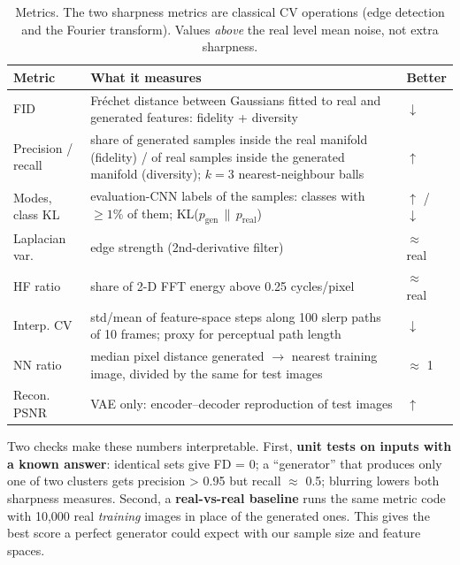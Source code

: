 \documentclass[11pt,letterpaper]{article}
\begin{document}
\begin{table}[!htbp]
\centering
\small
\begin{tabularx}{\linewidth}{@{}p{1.19in}>{\raggedright\arraybackslash}Xl@{}}
\toprule
Metric & What it measures & Better \\
\midrule
FID \cite{heusel2017} & Fréchet distance between Gaussians fitted to real and generated features: fidelity + diversity & \(\downarrow\) \\
Precision / recall \cite{kynkaanniemi2019} & share of generated samples inside the real manifold (fidelity) / of real samples inside the generated manifold (diversity); \(k=3\) nearest-neighbour balls & \(\uparrow\) \\
Modes, class KL & evaluation-CNN labels of the samples: classes with \(\geq 1\%\) of them; KL(\(p_\text{gen}\,\|\,p_\text{real}\)) & \(\uparrow\) / \(\downarrow\) \\
Laplacian var. \cite{pechpacheco2000} & edge strength (2nd-derivative filter) & \(\approx\) real \\
HF ratio & share of 2-D FFT energy above 0.25 cycles/pixel & \(\approx\) real \\
Interp. CV & std/mean of feature-space steps along 100 slerp paths \cite{white2016} of 10 frames; proxy for perceptual path length \cite{karras2019} & \(\downarrow\) \\
NN ratio & median pixel distance generated \(\to\) nearest training image, divided by the same for test images & \(\approx\) 1 \\
Recon. PSNR & VAE only: encoder--decoder reproduction of test images & \(\uparrow\) \\
\bottomrule
\end{tabularx}
\caption{Metrics. The two sharpness metrics are classical CV operations (edge detection and the Fourier transform). Values \emph{above} the real level mean noise, not extra sharpness.}
\label{tab:metrics}
\end{table}


Two checks make these numbers interpretable. First, \textbf{unit tests
on inputs with a known answer}: identical sets give FD = 0; a
``generator'' that produces only one of two clusters gets precision
\textgreater{} 0.95 but recall \(\approx\) 0.5; blurring lowers both
sharpness measures. Second, a \textbf{real-vs-real baseline} runs the
same metric code with 10,000 real \emph{training} images in place of the
generated ones. This gives the best score a perfect generator could
expect with our sample size and feature spaces.
\end{document}
